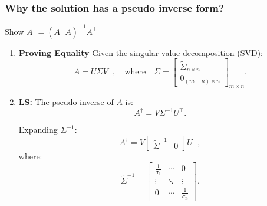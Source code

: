 \subsubsection{Why the solution has a pseudo inverse form?} Show $A^\dagger = (A^\top A)^{-1} A^\top$ 
\begin{intuition}
    \begin{enumerate}
        \item \textbf{Proving Equality} Given the singular value decomposition (SVD):
        \[
        A = U \Sigma V^\top, \quad \text{where} \quad \Sigma = 
        \begin{bmatrix}
        \tilde{\Sigma}_{n\times n} \\
        0_{(m-n) \times n}
        \end{bmatrix}_{m \times n}.
        \]
        
        \item \textbf{LS:} The pseudo-inverse of \(A\) is:
        \[
        A^\dagger = V \Sigma^{-1} U^\top.
        \]

        Expanding \( \Sigma^{-1} \):
        \[
        A^\dagger = V 
        \begin{bmatrix}
        \tilde{\Sigma}^{-1} & 0
        \end{bmatrix}
        U^\top,
        \]
        where:
        \[
        \tilde{\Sigma}^{-1} =
        \begin{bmatrix}
        \frac{1}{\sigma_1} & \cdots & 0 \\
        \vdots & \ddots & \vdots \\
        0 & \cdots & \frac{1}{\sigma_n}
        \end{bmatrix}.
        \]
        

\end{enumerate}
\end{intuition}
